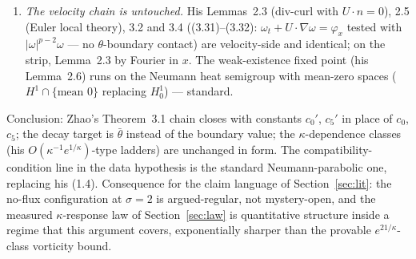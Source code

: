 \documentclass[11pt,a4paper]{article}
\newcommand{\abs}[1]{\lvert #1 \rvert}
\begin{document}
\begin{enumerate}[leftmargin=2em]
\item \emph{The velocity chain is untouched.} His Lemmas~2.3 (div-curl with $U\cdot n=0$), 2.5 (Euler local theory), 3.2 and 3.4 ((3.31)--(3.32): $\omega_t+U\cdot\nabla\omega=\varphi_x$ tested with $\abs\omega^{p-2}\omega$ --- no $\theta$-boundary contact) are velocity-side and identical; on the strip, Lemma~2.3 by Fourier in $x$. The weak-existence fixed point (his Lemma~2.6) runs on the Neumann heat semigroup with mean-zero spaces ($H^1\cap\{\text{mean }0\}$ replacing $H^1_0$) --- standard.
\end{enumerate}
Conclusion: Zhao's Theorem~3.1 chain closes with constants $c_0'$, $c_5'$ in place of $c_0$, $c_5$; the decay target is $\bar\theta$ instead of the boundary value; the $\kappa$-dependence classes (his $O(\kappa^{-1}e^{1/\kappa})$-type ladders) are unchanged in form. The compatibility-condition line in the data hypothesis is the standard Neumann-parabolic one, replacing his (1.4). Consequence for the claim language of Section~\ref{sec:lit}: the no-flux configuration at $\sigma=2$ is argued-regular, not mystery-open, and the measured $\kappa$-response law of Section~\ref{sec:law} is quantitative structure inside a regime that this argument covers, exponentially sharper than the provable $e^{21/\kappa}$-class vorticity bound.
\end{document}
